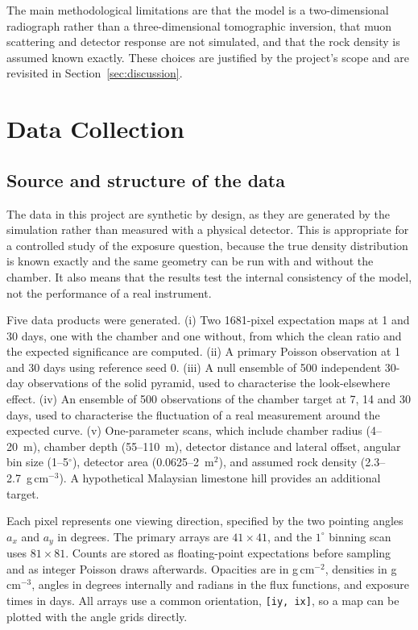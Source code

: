 \documentclass{article}
\begin{document}
The main methodological limitations are that the model is a two-dimensional
radiograph rather than a three-dimensional tomographic inversion, that muon
scattering and detector response are not simulated, and that the rock density
is assumed known exactly. These choices are justified by the project's scope
and are revisited in Section~\ref{sec:discussion}.


\section{Data Collection}
\label{sec:data}

\subsection{Source and structure of the data}

The data in this project are synthetic by design, as they are generated by the
simulation rather than measured with a physical detector. This is appropriate
for a controlled study of the exposure question, because the true density
distribution is known exactly and the same geometry can be run with and without
the chamber. It also means that the results test the internal consistency of
the model, not the performance of a real instrument.

Five data products were generated. (i) Two 1681-pixel expectation maps at 1 and
30 days, one with the chamber and one without, from which the clean ratio and
the expected significance are computed. (ii) A primary Poisson observation at 1
and 30 days using reference seed 0. (iii) A null ensemble of 500 independent
30-day observations of the solid pyramid, used to characterise the
look-elsewhere effect. (iv) An ensemble of 500 observations of the chamber
target at 7, 14 and 30 days, used to characterise the fluctuation of a real
measurement around the expected curve. (v) One-parameter scans, which include chamber radius
(4--20~m), chamber depth (55--110~m), detector distance and lateral offset,
angular bin size (1--5$^\circ$), detector area (0.0625--2~m$^2$), and assumed
rock density (2.3--2.7~g\,cm$^{-3}$). A hypothetical Malaysian limestone hill
provides an additional target.

Each pixel represents one viewing direction, specified by the two pointing
angles $a_x$ and $a_y$ in degrees. The primary arrays are
$41\times41$, and the $1^\circ$ binning scan uses $81\times81$. Counts are stored
as floating-point expectations before sampling and as integer Poisson draws
afterwards. Opacities are in g\,cm$^{-2}$, densities in g\,cm$^{-3}$, angles in
degrees internally and radians in the flux functions, and exposure times in
days. All arrays use a common orientation, \texttt{[iy, ix]}, so a map can be
plotted with the angle grids directly.
\end{document}
